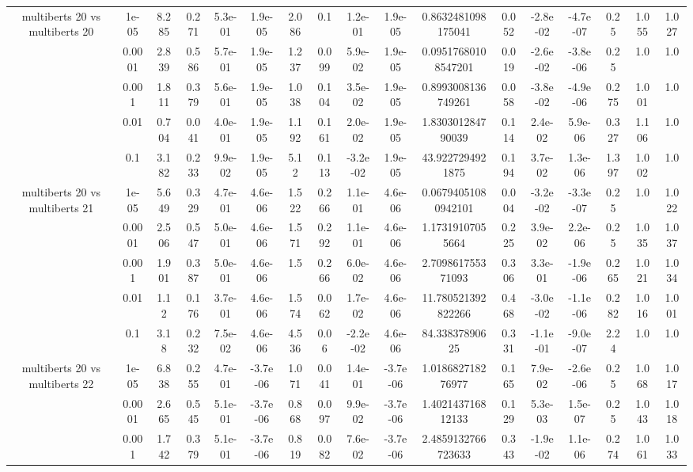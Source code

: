 \begin{tabular}{|c|c|c|c|c|c|c|c|c|c|c|c|c|c|c|c|c|}
\hline
\multirow{5}{*}{multiberts 20 vs multiberts 20} & 1e-05 & 8.285 & 0.271 & 5.3e-01 & 1.9e-05 & 2.086 & 0.1 & 1.2e-01 & 1.9e-05 & 0.8632481098175041 & 0.052 & -2.8e-02 & -4.7e-07 & 0.25 & 1.055 & 1.027 \\
 & 0.0001 & 2.839 & 0.586 & 5.7e-01 & 1.9e-05 & 1.237 & 0.099 & 5.9e-02 & 1.9e-05 & 0.09517680108547201 & 0.019 & -2.6e-02 & -3.8e-06 & 0.25 & 1.0 & 1.0 \\
 & 0.001 & 1.811 & 0.379 & 5.6e-01 & 1.9e-05 & 1.038 & 0.104 & 3.5e-02 & 1.9e-05 & 0.8993008136749261 & 0.058 & -3.8e-02 & -4.9e-06 & 0.275 & 1.001 & 1.0 \\
 & 0.01 & 0.704 & 0.041 & 4.0e-01 & 1.9e-05 & 1.192 & 0.161 & 2.0e-02 & 1.9e-05 & 1.830301284790039 & 0.114 & 2.4e-02 & 5.9e-06 & 0.327 & 1.106 & 1.0 \\
 & 0.1 & 3.182 & 0.233 & 9.9e-02 & 1.9e-05 & 5.12 & 0.113 & -3.2e-02 & 1.9e-05 & 43.9227294921875 & 0.194 & 3.7e-02 & 1.3e-06 & 1.397 & 1.002 & 1.0 \\
\hline
\multirow{5}{*}{multiberts 20 vs multiberts 21} & 1e-05 & 5.649 & 0.329 & 4.7e-01 & 4.6e-06 & 1.522 & 0.266 & 1.1e-01 & 4.6e-06 & 0.06794051080942101 & 0.004 & -3.2e-02 & -3.3e-07 & 0.25 & 1.0 & 1.022 \\
 & 0.0001 & 2.506 & 0.547 & 5.0e-01 & 4.6e-06 & 1.571 & 0.292 & 1.1e-01 & 4.6e-06 & 1.17319107055664 & 0.225 & 3.9e-02 & 2.2e-06 & 0.25 & 1.035 & 1.037 \\
 & 0.001 & 1.901 & 0.387 & 5.0e-01 & 4.6e-06 & 1.5 & 0.266 & 6.0e-02 & 4.6e-06 & 2.709861755371093 & 0.306 & 3.3e-01 & -1.9e-06 & 0.265 & 1.021 & 1.034 \\
 & 0.01 & 1.12 & 0.176 & 3.7e-01 & 4.6e-06 & 1.574 & 0.062 & 1.7e-02 & 4.6e-06 & 11.780521392822266 & 0.468 & -3.0e-02 & -1.1e-06 & 0.282 & 1.016 & 1.001 \\
 & 0.1 & 3.18 & 0.232 & 7.5e-02 & 4.6e-06 & 4.536 & 0.06 & -2.2e-02 & 4.6e-06 & 84.33837890625 & 0.331 & -1.1e-01 & -9.0e-07 & 2.24 & 1.0 & 1.0 \\
\hline
\multirow{5}{*}{multiberts 20 vs multiberts 22} & 1e-05 & 6.838 & 0.255 & 4.7e-01 & -3.7e-06 & 1.071 & 0.041 & 1.4e-01 & -3.7e-06 & 1.018682718276977 & 0.165 & 7.9e-02 & -2.6e-06 & 0.25 & 1.068 & 1.017 \\
 & 0.0001 & 2.665 & 0.545 & 5.1e-01 & -3.7e-06 & 0.868 & 0.097 & 9.9e-02 & -3.7e-06 & 1.402143716812133 & 0.129 & 5.3e-03 & 1.5e-07 & 0.25 & 1.043 & 1.018 \\
 & 0.001 & 1.742 & 0.379 & 5.1e-01 & -3.7e-06 & 0.819 & 0.082 & 7.6e-02 & -3.7e-06 & 2.4859132766723633 & 0.343 & -1.9e-02 & 1.1e-06 & 0.274 & 1.061 & 1.033 \\

\end{tabular}
